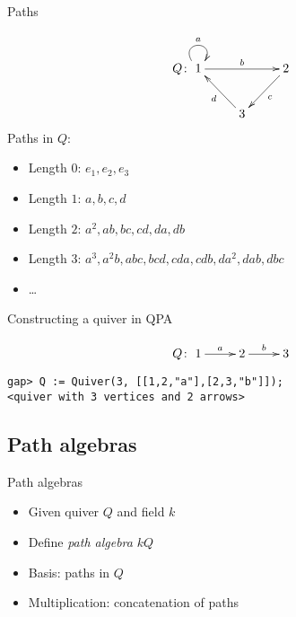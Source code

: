 \documentclass[usenames,dvipsnames]{beamer}
\newcommand{\defn}[1]{\textit{#1}}
\begin{document}
\begin{frame}{Paths}

{\Large
\[
Q \colon \xymatrix{1\ar@(ul,ur)^a\ar[rr]^b & & 2\ar[dl]^c \\ & 3\ar[ul]^d & }
\]
}
Paths in $Q$:\pause
\begin{itemize}
\item Length $0$: $e_1, e_2, e_3$
\pause
\item Length $1$: $a, b, c, d$
\pause
\item Length $2$: $a^2, ab, bc, cd, da, db$
\pause
\item Length $3$: $a^3, a^2b, abc, bcd, cda, cdb, da^2, dab, dbc$
\pause
\item \ldots
\end{itemize}
\end{frame}


\begin{frame}[fragile]{Constructing a quiver in QPA}

{\Large
\[
Q \colon \xymatrix{1\ar[r]^a & 2\ar[r]^b & 3}
\]
}
\begin{verbatim}
gap> Q := Quiver(3, [[1,2,"a"],[2,3,"b"]]); 
<quiver with 3 vertices and 2 arrows>
\end{verbatim}
\end{frame}



\subsection{Path algebras}

\begin{frame}{Path algebras}

\begin{itemize}
\item Given quiver $Q$ and field $k$
\item Define \defn{path algebra} $kQ$
\item Basis: paths in $Q$
\item Multiplication: concatenation of paths
\end{itemize}
\end{frame}
\end{document}
